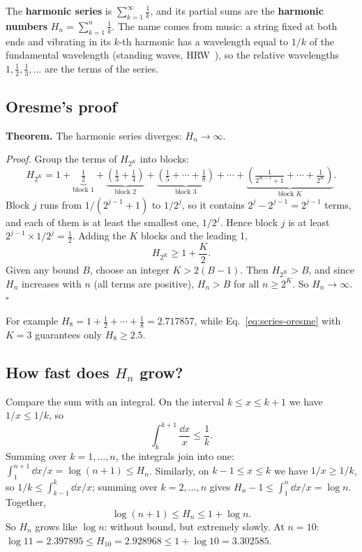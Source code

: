 The \textbf{harmonic series} is $\sum_{k=1}^\infty\frac1k$, and its partial sums are the \textbf{harmonic numbers} $H_n=\sum_{k=1}^n\frac1k$. The name comes from music: a string fixed at both ends and vibrating in its $k$-th harmonic has a wavelength equal to $1/k$ of the fundamental wavelength (standing waves, HRW~\cite{hrw}), so the relative wavelengths $1,\tfrac12,\tfrac13,\dots$ are the terms of the series.

\subsection{Oresme's proof}

\textbf{Theorem.} The harmonic series diverges: $H_n\to\infty$.

\emph{Proof.} Group the terms of $H_{2^K}$ into blocks:
\[
H_{2^K}=1+\underbrace{\tfrac12}_{\text{block }1}+\underbrace{\left(\tfrac13+\tfrac14\right)}_{\text{block }2}+\underbrace{\left(\tfrac15+\cdots+\tfrac18\right)}_{\text{block }3}+\cdots+\underbrace{\left(\tfrac1{2^{K-1}+1}+\cdots+\tfrac1{2^K}\right)}_{\text{block }K}.
\]
Block $j$ runs from $1/(2^{j-1}+1)$ to $1/2^j$, so it contains $2^j-2^{j-1}=2^{j-1}$ terms, and each of them is at least the smallest one, $1/2^j$. Hence block $j$ is at least $2^{j-1}\times 1/2^j=\tfrac12$. Adding the $K$ blocks and the leading 1,
\begin{equation}
H_{2^K}\ge1+\frac K2 .
\label{eq:series-oresme}
\end{equation}
Given any bound $B$, choose an integer $K>2(B-1)$. Then $H_{2^K}>B$, and since $H_n$ increases with $n$ (all terms are positive), $H_n>B$ for all $n\ge2^K$. So $H_n\to\infty$. $\square$

For example $H_8=1+\tfrac12+\cdots+\tfrac18=2.717857$, while Eq.~\eqref{eq:series-oresme} with $K=3$ guarantees only $H_8\ge2.5$.

\subsection{How fast does $H_n$ grow?}

Compare the sum with an integral. On the interval $k\le x\le k+1$ we have $1/x\le1/k$, so
\[
\int_k^{k+1}\frac{\dd x}{x}\le\frac1k .
\]
Summing over $k=1,\dots,n$, the integrals join into one: $\int_1^{n+1}\dd x/x=\log(n+1)\le H_n$. Similarly, on $k-1\le x\le k$ we have $1/x\ge1/k$, so $1/k\le\int_{k-1}^k\dd x/x$; summing over $k=2,\dots,n$ gives $H_n-1\le\int_1^n\dd x/x=\log n$. Together,
\begin{equation}
\log(n+1)\le H_n\le1+\log n .
\label{eq:series-harmonic-bounds}
\end{equation}
So $H_n$ grows like $\log n$: without bound, but extremely slowly. At $n=10$: $\log 11=2.397895\le H_{10}=2.928968\le1+\log10=3.302585$.

